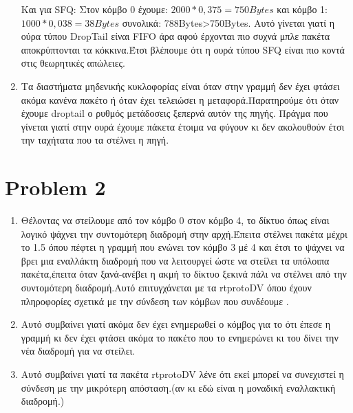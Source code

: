 \documentclass{article}
\begin{document}
\begin{enumerate}
Και για SFQ: Στον κόμβο 0 έχουμε: $2000*0,375=750Bytes$ και κόμβο 1: $1000*0,038=38Bytes$ συνολικά: 788Bytes>750Bytes.
Αυτό γίνεται γιατί η ούρα τύπου DropTail είναι FIFO άρα αφού έρχονται πιο συχνά μπλε πακέτα αποκρύπτονται τα κόκκινα.Έτσι βλέπουμε ότι η ουρά τύπου SFQ είναι πιο κοντά στις θεωρητικές απώλειες.
\item
Τα διαστήματα μηδενικής κυκλοφορίας είναι όταν στην γραμμή δεν έχει φτάσει ακόμα κανένα πακέτο ή όταν έχει τελειώσει η μεταφορά.Παρατηρούμε ότι όταν έχουμε droptail ο ρυθμός μετάδοσεις ξεπερνά αυτόν της πηγής. Πράγμα που γίνεται γιατί στην ουρά έχουμε πάκετα έτοιμα να φύγουν κι δεν ακολουθούν έτσι την ταχήτατα που τα στέλνει η πηγή.
\end{enumerate}
\section*{Problem 2}
\begin{enumerate}
\item %
Θέλοντας να στείλουμε από τον κόμβο 0 στον κόμβο 4, το δίκτυο όπως είναι λογικό  ψάχνει την συντομότερη διαδρομή στην αρχή.Έπειτα στέλνει πακέτα μέχρι το 1.5 όπου πέφτει η γραμμή που ενώνει τον κόμβο 3 μέ 4 και έτσι το ψάχνει να βρει μια εναλλάκτη διαδρομή που να λειτουργεί ώστε να στείλει τα υπόλοιπα πακέτα,έπειτα όταν ξανά-ανέβει η ακμή το δίκτυο ξεκινά πάλι να στέλνει από την συντομότερη διαδρομή.Αυτό επιτυγχάνεται με τα rtprotoDV όπου έχουν πληροφορίες σχετικά με την σύνδεση των κόμβων που συνδέουμε .  
\item
Αυτό συμβαίνει γιατί ακόμα δεν έχει ενημερωθεί ο κόμβος για το ότι έπεσε η γραμμή κι δεν έχει φτάσει ακόμα το πακέτο που το ενημερώνει κι του δίνει την νέα διαδρομή για να στείλει.
\item
Αυτό συμβαίνει γιατί τα πακέτα rtprotoDV λένε ότι εκεί μπορεί να συνεχιστεί η σύνδεση με την μικρότερη απόσταση.(αν κι εδώ είναι η μοναδική εναλλακτική διαδρομή.)
\end{enumerate}
\end{document}

